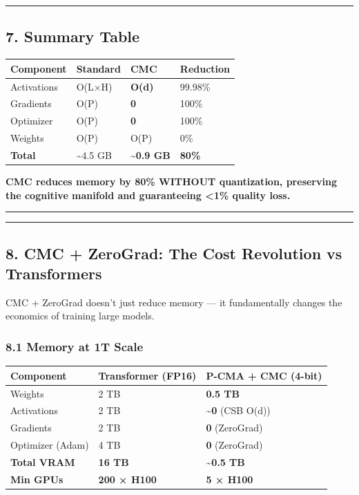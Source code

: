 \documentclass[
  11pt,
  a4paper,
]{article}
\begin{document}
\begin{center}\rule{0.5\linewidth}{0.5pt}\end{center}

\subsection{7. Summary Table}\label{summary-table}

\begin{longtable}[]{@{}llll@{}}
\toprule\noalign{}
Component & Standard & CMC & Reduction \\
\midrule\noalign{}
\endhead
\bottomrule\noalign{}
\endlastfoot
Activations & O(L×H) & \textbf{O(d)} & 99.98\% \\
Gradients & O(P) & \textbf{0} & 100\% \\
Optimizer & O(P) & \textbf{0} & 100\% \\
Weights & O(P) & O(P) & 0\% \\
\textbf{Total} & \textasciitilde4.5 GB & \textbf{\textasciitilde0.9 GB}
& \textbf{80\%} \\
\end{longtable}

\textbf{CMC reduces memory by 80\% WITHOUT quantization, preserving the
cognitive manifold and guaranteeing \textless1\% quality loss.}

\begin{center}\rule{0.5\linewidth}{0.5pt}\end{center}

\begin{center}\rule{0.5\linewidth}{0.5pt}\end{center}

\subsection{8. CMC + ZeroGrad: The Cost Revolution vs
Transformers}\label{cmc-zerograd-the-cost-revolution-vs-transformers}

CMC + ZeroGrad doesn't just reduce memory --- it fundamentally changes
the economics of training large models.

\subsubsection{8.1 Memory at 1T Scale}\label{memory-at-1t-scale}

\begin{longtable}[]{@{}lll@{}}
\toprule\noalign{}
Component & Transformer (FP16) & P-CMA + CMC (4-bit) \\
\midrule\noalign{}
\endhead
\bottomrule\noalign{}
\endlastfoot
Weights & 2 TB & \textbf{0.5 TB} \\
Activations & 2 TB & \textbf{\textasciitilde0} (CSB O(d)) \\
Gradients & 2 TB & \textbf{0} (ZeroGrad) \\
Optimizer (Adam) & 4 TB & \textbf{0} (ZeroGrad) \\
\textbf{Total VRAM} & \textbf{16 TB} & \textbf{\textasciitilde0.5 TB} \\
\textbf{Min GPUs} & \textbf{200 × H100} & \textbf{5 × H100} \\
\end{longtable}
\end{document}
